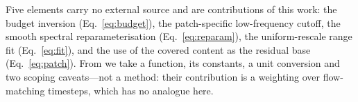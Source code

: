 \documentclass[11pt,a4paper]{article}
\begin{document}
\noindent
Five elements carry no external source and are contributions of this
work: the budget inversion (Eq.~\ref{eq:budget}), the patch-specific
low-frequency cutoff, the smooth spectral reparameterisation
(Eq.~\ref{eq:reparam}), the uniform-rescale range fit
(Eq.~\ref{eq:fit}), and the use of the covered content as the residual
base (Eq.~\ref{eq:patch}). From \citet{galinska2026csflow} we take a
function, its constants, a unit conversion and two scoping caveats---not
a method: their contribution is a weighting over flow-matching
timesteps, which has no analogue here.



\end{document}
